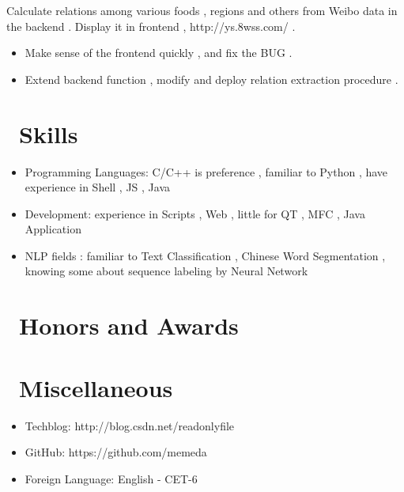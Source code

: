 \documentclass{resume}
\begin{document}
Calculate relations among various foods , regions and others from Weibo data in the backend .
Display it in frontend ,  http://ys.8wss.com/ .
\begin{itemize}
  \item Make sense of the frontend quickly , and fix the BUG .
  \item Extend backend function , modify and deploy relation extraction procedure .
\end{itemize}



\section{\faCogs\ Skills}
\begin{itemize}[parsep=0.5ex]
  \item Programming Languages: C/C++ is preference , familiar to Python , have experience in Shell , JS , Java
  \item Development: experience in Scripts , Web , little for  QT , MFC , Java Application
  \item NLP fields : familiar to Text Classification , Chinese Word Segmentation , knowing some about sequence labeling by Neural Network
\end{itemize}

\section{\faHeartO\ Honors and Awards}

\section{\faInfo\ Miscellaneous}
\begin{itemize}[parsep=0.5ex]
  \item Techblog: http://blog.csdn.net/readonlyfile
  \item GitHub: https://github.com/memeda
  \item Foreign Language: English - CET-6
\end{itemize}

%
%
\end{document}
